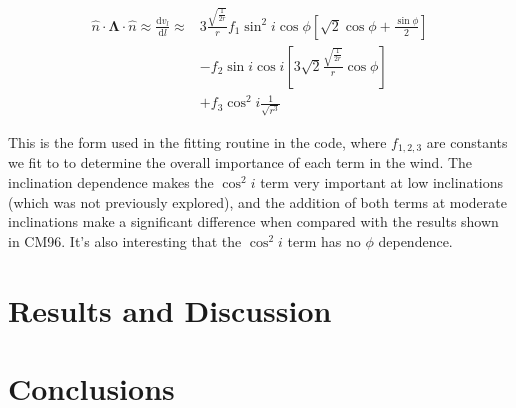 \documentclass[12pt, a4paper]{article}
\begin{document}
\begin{equation} \label{eq4}
\begin{split}
\hat{n}\cdot\boldsymbol{\Lambda}\cdot\hat{n} \approx \frac{\mathrm{d}v_l}{\mathrm{d}l} \approx & 3\frac{\sqrt{\frac{1}{2r}}}{r} f_1 \sin^2i\cos\phi\left[\sqrt{2}\cos\phi + \frac{\sin\phi}{2}\right]\\
& - f_2 \sin i \cos i \left[3\sqrt{2}\frac{\sqrt{\frac{1}{2r}}}{r}\cos\phi\right] \\
& + f_3 \cos^2i\frac{1}{\sqrt{r^3}}
\end{split}
\end{equation}

This is the form used in the fitting routine in the code, where $f_{1,2,3}$ are constants we fit to to determine the overall importance of each term in the wind. The inclination dependence makes the $\cos^2i$ term very important at low inclinations (which was not previously explored), and the addition of both terms at moderate inclinations make a significant difference when compared with the results shown in CM96. It's also interesting that the $\cos^2i$ term has no $\phi$ dependence.

\section{Results and Discussion}


\section{Conclusions}



\nocite{*}


\end{document}
